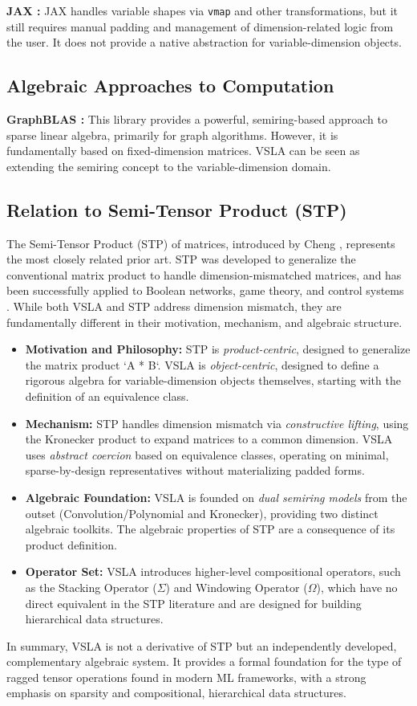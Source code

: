 \textbf{JAX \cite{JAX2020}:} JAX handles variable shapes via \texttt{vmap} and other transformations, but it still requires manual padding and management of dimension-related logic from the user. It does not provide a native abstraction for variable-dimension objects.

\subsection{Algebraic Approaches to Computation}

\textbf{GraphBLAS \cite{GraphBLAS2019}:} This library provides a powerful, semiring-based approach to sparse linear algebra, primarily for graph algorithms. However, it is fundamentally based on fixed-dimension matrices. VSLA can be seen as extending the semiring concept to the variable-dimension domain.

\subsection{Relation to Semi-Tensor Product (STP)}
The Semi-Tensor Product (STP) of matrices, introduced by Cheng \cite{Cheng2001}, represents the most closely related prior art. STP was developed to generalize the conventional matrix product to handle dimension-mismatched matrices, and has been successfully applied to Boolean networks, game theory, and control systems \cite{Cheng2011}. While both VSLA and STP address dimension mismatch, they are fundamentally different in their motivation, mechanism, and algebraic structure.

\begin{itemize}
    \item \textbf{Motivation and Philosophy:} STP is \textit{product-centric}, designed to generalize the matrix product `A * B`. VSLA is \textit{object-centric}, designed to define a rigorous algebra for variable-dimension objects themselves, starting with the definition of an equivalence class.
    \item \textbf{Mechanism:} STP handles dimension mismatch via \textit{constructive lifting}, using the Kronecker product to expand matrices to a common dimension. VSLA uses \textit{abstract coercion} based on equivalence classes, operating on minimal, sparse-by-design representatives without materializing padded forms.
    \item \textbf{Algebraic Foundation:} VSLA is founded on \textit{dual semiring models} from the outset (Convolution/Polynomial and Kronecker), providing two distinct algebraic toolkits. The algebraic properties of STP are a consequence of its product definition.
    \item \textbf{Operator Set:} VSLA introduces higher-level compositional operators, such as the Stacking Operator ($\Sigma$) and Windowing Operator ($\Omega$), which have no direct equivalent in the STP literature and are designed for building hierarchical data structures.
\end{itemize}

In summary, VSLA is not a derivative of STP but an independently developed, complementary algebraic system. It provides a formal foundation for the type of ragged tensor operations found in modern ML frameworks, with a strong emphasis on sparsity and compositional, hierarchical data structures.
